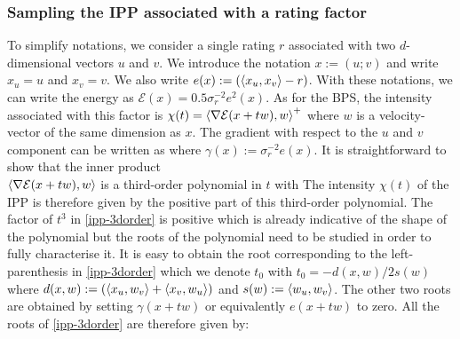 \subsubsection{Sampling the IPP associated with a rating factor}

To simplify notations, we consider a single rating $r$ associated with two $d$-dimensional vectors $u$ and $v$. We introduce the notation $x:=(u; v)$ and write $x_{u}=u$ and $x_{v}=v$. We also write $e(x):=(\left\langle x_{u},x_{v} \right\rangle-r)$. With these notations, we can write the energy as $\mathcal E(x) = 0.5\sigma_{r}^{-2}e^{2}(x)$. 
As for the BPS, the intensity associated with this factor is $\chi(t) = \left\langle \nabla \mathcal E(x+tw), w \right\rangle^{+}$ where $w$ is a velocity-vector of the same dimension as $x$. The gradient with respect to the $u$ and $v$ component can be written as
where $\gamma(x):=\sigma_{r}^{-2}e(x)$. It is straightforward to show that the inner product \\$\left\langle \nabla\mathcal E(x+tw), w \right\rangle$ is a third-order polynomial in $t$ with
The intensity $\chi(t)$ of the IPP is therefore given by the positive part of this third-order polynomial. The factor of $t^{3}$ in \eqref{ipp-3dorder} is positive which is already indicative of the shape of the polynomial but the roots of the polynomial need to be studied in order to fully characterise it. It is easy to obtain the root corresponding to the left-parenthesis in \eqref{ipp-3dorder} which we denote $t_{0}$ with $t_{0}=-d(x,w)/2s(w)$ where $d(x,w):=(\left\langle x_{u}, w_{v} \right\rangle+\left\langle x_{v},w_{u} \right\rangle)$ and $s(w):=\left\langle w_{u},w_{v} \right\rangle$. The other two roots are obtained by setting $\gamma(x+tw)$ or equivalently $e(x+tw)$ to zero. All the roots of \eqref{ipp-3dorder} are therefore given by:

